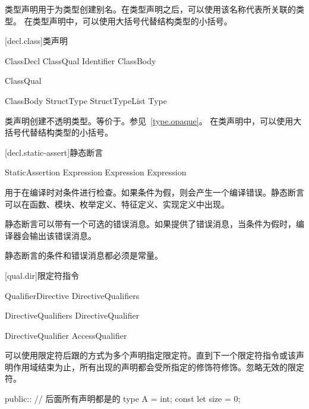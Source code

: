 \pnum
类型声明用于为类型创建别名。在类型声明之后，可以使用该名称代表所关联的类型。
在类型声明中，可以使用大括号代替结构类型的小括号。

[decl.class]{类声明}

\begin{bnf}{ClassDecl}
    ClassQual\bnfs {} Identifier ClassBody
\end{bnf}

\begin{bnf}{ClassQual}
\end{bnf}

\begin{bnf}{ClassBody}
    StructType \br
    \terminal{\{} \terminal{\}} \br
    \terminal{\{} StructTypeList \terminal{,}\bnfq \terminal{\}} \br
    \terminal{=} Type
\end{bnf}

\pnum
类声明创建不透明类型。等价于。参见~\ref{type.opaque}。
在类声明中，可以使用大括号代替结构类型的小括号。

[decl.static-assert]{静态断言}

\begin{bnf}{StaticAssertion}
      Expression \terminal{;} \br
      Expression \terminal{:} Expression \terminal{;}
\end{bnf}

\pnum
{}用于在编译时对条件进行检查。如果条件为假，则会产生一个编译错误。静态断言可以在函数、模块、枚举定义、特征定义、实现定义中出现。

\pnum
静态断言可以带有一个可选的错误消息。如果提供了错误消息，当条件为假时，编译器会输出该错误消息。

\pnum
静态断言的条件和错误消息都必须是常量。

[qual.dir]{限定符指令}

\begin{bnf}{QualifierDirective}
    DirectiveQualifiers \terminal{::}
\end{bnf}

\begin{bnf}{DirectiveQualifiers}
    DirectiveQualifier\bnfp
\end{bnf}

\begin{bnf}{DirectiveQualifier}
    AccessQualifier
\end{bnf}

\pnum
可以使用限定符后跟\tcode{::}的方式为多个声明指定限定符。直到下一个限定符指令或该声明作用域结束为止，所有出现的声明都会受所指定的修饰符修饰。忽略无效的限定符。

\enterexample
\begin{codeblock}
public:: // 后面所有声明都是的
type A = int;
const let size = 0;
\end{codeblock}